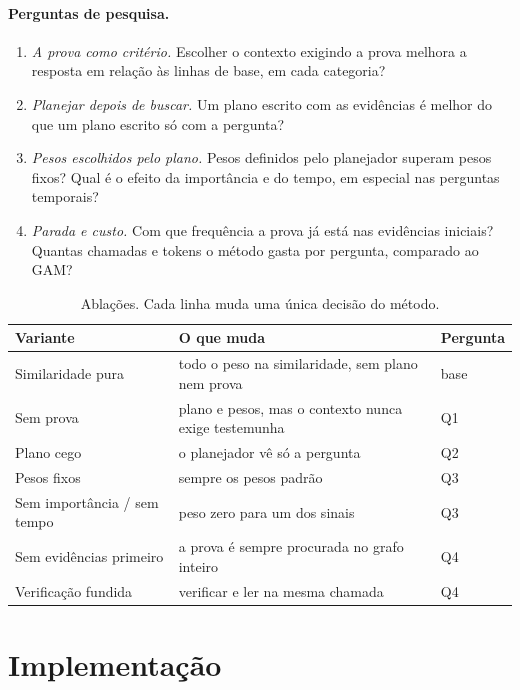 \documentclass[11pt]{article}
\begin{document}
\paragraph{Perguntas de pesquisa.}
\begin{enumerate}[label=\textbf{Q\arabic*},leftmargin=*,itemsep=1pt]
\item \emph{A prova como critério.} Escolher o contexto exigindo a prova
  melhora a resposta em relação às linhas de base, em cada categoria?
\item \emph{Planejar depois de buscar.} Um plano escrito com as evidências é
  melhor do que um plano escrito só com a pergunta?
\item \emph{Pesos escolhidos pelo plano.} Pesos definidos pelo planejador
  superam pesos fixos? Qual é o efeito da importância e do tempo, em especial
  nas perguntas temporais?
\item \emph{Parada e custo.} Com que frequência a prova já está nas
  evidências iniciais? Quantas chamadas e tokens o método gasta por pergunta,
  comparado ao GAM?
\end{enumerate}

\begin{table}[H]
\centering
\small
\begin{tabularx}{\textwidth}{@{}l Y l@{}}
\toprule
Variante & O que muda & Pergunta \\
\midrule
Similaridade pura & todo o peso na similaridade, sem plano nem prova & base \\
Sem prova & plano e pesos, mas o contexto nunca exige testemunha & Q1 \\
Plano cego & o planejador vê só a pergunta & Q2 \\
Pesos fixos & sempre os pesos padrão & Q3 \\
Sem importância / sem tempo & peso zero para um dos sinais & Q3 \\
Sem evidências primeiro & a prova é sempre procurada no grafo inteiro & Q4 \\
Verificação fundida & verificar e ler na mesma chamada & Q4 \\
\bottomrule
\end{tabularx}
\caption{Ablações. Cada linha muda uma única decisão do método.}
\label{tab:ablacoes}
\end{table}

\appendix
\section{Implementação}
\end{document}
